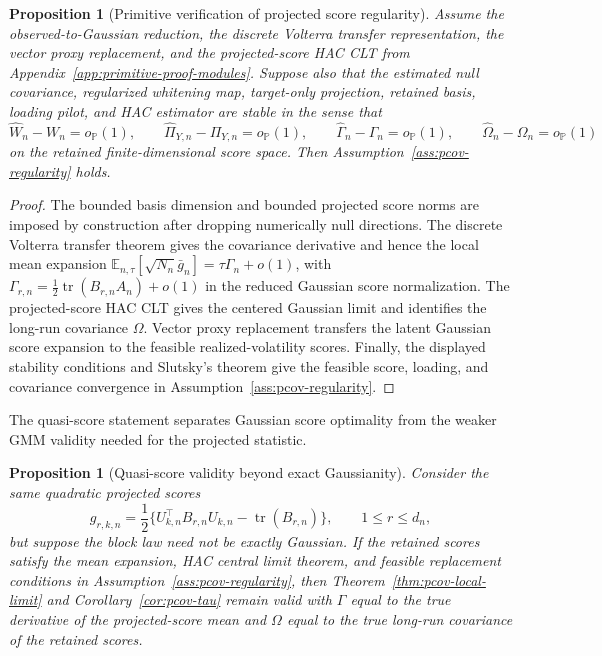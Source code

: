 \documentclass[11pt,a4paper]{amsart}
\theoremstyle{plain}
\newtheorem{proposition}[theorem]{Proposition}
\theoremstyle{definition}
\theoremstyle{remark}
\DeclareMathOperator{\tr}{tr}
\newcommand{\PP}{\mathbb{P}}
\newcommand{\EE}{\mathbb{E}}
\begin{document}
\begin{proposition}[Primitive verification of projected score regularity]\label{prop:primitive-pcov-regularity}
Assume the observed-to-Gaussian reduction, the discrete Volterra transfer representation,
the vector proxy replacement, and the projected-score HAC CLT from
Appendix~\ref{app:primitive-proof-modules}.  Suppose also that the estimated null covariance,
regularized whitening map, target-only projection, retained basis, loading pilot, and HAC estimator
are stable in the sense that
\[
        \widehat W_n-W_n=o_{\PP}(1),
        \qquad
        \widehat\Pi_{Y,n}-\Pi_{Y,n}=o_{\PP}(1),
        \qquad
        \widehat\Gamma_n-\Gamma_n=o_{\PP}(1),
        \qquad
        \widehat\Omega_n-\Omega_n=o_{\PP}(1)
\]
on the retained finite-dimensional score space.  Then Assumption~\ref{ass:pcov-regularity} holds.
\end{proposition}

\begin{proof}
The bounded basis dimension and bounded projected score norms are imposed by construction after
dropping numerically null directions.  The discrete Volterra transfer theorem gives the covariance
derivative and hence the local mean expansion
\(\EE_{n,\tau}[\sqrt{N_n}\bar g_n]=\tau\Gamma_n+o(1)\), with
\(\Gamma_{r,n}=\frac12\tr(B_{r,n}A_n)+o(1)\) in the reduced Gaussian score normalization.  The
projected-score HAC CLT gives the centered Gaussian limit and identifies the long-run covariance
\(\Omega\).  Vector proxy replacement transfers the latent Gaussian score expansion to the feasible
realized-volatility scores.  Finally, the displayed stability conditions and Slutsky's theorem give
the feasible score, loading, and covariance convergence in Assumption~\ref{ass:pcov-regularity}.
\end{proof}

The quasi-score statement separates Gaussian score optimality from the weaker GMM validity needed
for the projected statistic.

\begin{proposition}[Quasi-score validity beyond exact Gaussianity]\label{prop:quasi-score-validity}
Consider the same quadratic projected scores
\[
        g_{r,k,n}
        =
        \frac12\{U_{k,n}^\top B_{r,n}U_{k,n}-\tr(B_{r,n})\},
        \qquad 1\le r\le d_n,
\]
but suppose the block law need not be exactly Gaussian.  If the retained scores satisfy the mean
expansion, HAC central limit theorem, and feasible replacement conditions in
Assumption~\ref{ass:pcov-regularity}, then Theorem~\ref{thm:pcov-local-limit} and
Corollary~\ref{cor:pcov-tau} remain valid with
\(\Gamma\) equal to the true derivative of the projected-score mean and \(\Omega\) equal to the true
long-run covariance of the retained scores.
\end{proposition}
\end{document}
